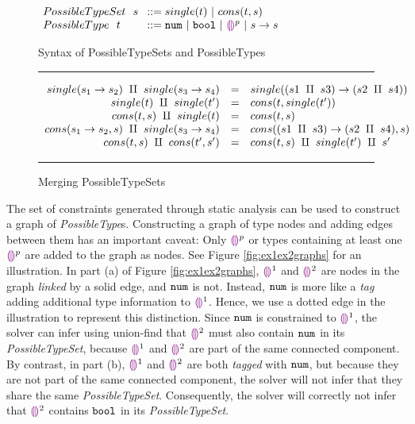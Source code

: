 \begin{figure}[h!]
\centering
\vspace{-3px} 
$\arraycolsep=4pt\begin{array}{lll}
PossibleTypeSet~~ s & ::= 
single(t) ~\vert~ 
cons(t, s)
\\
PossibleType~~ t & ::= 
  \tnum ~\vert~
  \tbool ~\vert~
  \ehole^p ~\vert~
  \tarr{s}{s}
  \\
\end{array}$
\label{fig:syntax_possible_type_sets}
\caption{Syntax of PossibleTypeSets and PossibleTypes}
\vspace{5px} 
\hrule
\[\begin{array}{rcl}
    single(s_1 \rightarrow s_2) ~\amalg~ single(s_3 \rightarrow s_4) & = & single({(s1 ~\amalg~ s3) \rightarrow (s2 ~\amalg~ s4)}) \\
    single(t) ~\amalg~ single(t') & = & cons(t, single(t')) \\
    cons(t,s) ~\amalg~ single(t) & = & cons(t, s) \\
    cons(s_1 \rightarrow s_2, s) ~\amalg~ single(s_3 \rightarrow s_4) & = & cons((s1 ~\amalg~ s3) \rightarrow (s2 ~\amalg~ s4) , s) \\
    cons(t,s) ~\amalg~ cons(t',s') & = & cons(t,s) ~\amalg~ single(t') ~\amalg~ s' \\
\end{array}\] 
\caption{Merging PossibleTypeSets}
\vspace{5px} 
\hrule
\label{fig:possible_type_sets}
\vspace{-5px}
\end{figure}

The set of constraints generated through static analysis can be used to construct a graph of \textit{PossibleType}s. Constructing a graph of type nodes and adding edges between them has an important caveat: Only $\textcolor{violet}{\llparenthesis}\textcolor{violet}{\rrparenthesis}^{p}$ or types containing at least one $\textcolor{violet}{\llparenthesis}\textcolor{violet}{\rrparenthesis}^{p}$ are added to the graph as nodes. See Figure \ref{fig:ex1ex2graphs} for an illustration. In part (a) of Figure \ref{fig:ex1ex2graphs}, $\textcolor{violet}{\llparenthesis}\textcolor{violet}{\rrparenthesis}^{1}$ and $\textcolor{violet}{\llparenthesis}\textcolor{violet}{\rrparenthesis}^{2}$ are nodes in the graph \textit{linked} by a solid edge, and $\mathtt{num}$ is not. Instead, $\mathtt{num}$ is more like a \textit{tag} adding additional type information to $\textcolor{violet}{\llparenthesis}\textcolor{violet}{\rrparenthesis}^{1}$. Hence, we use a dotted edge in the illustration to represent this distinction. Since $\mathtt{num}$ is constrained to $\textcolor{violet}{\llparenthesis}\textcolor{violet}{\rrparenthesis}^{1}$, the solver can infer using union-find that $\textcolor{violet}{\llparenthesis}\textcolor{violet}{\rrparenthesis}^{2}$ must also contain $\mathtt{num}$ in its \textit{PossibleTypeSet}, because $\textcolor{violet}{\llparenthesis}\textcolor{violet}{\rrparenthesis}^{1}$ and $\textcolor{violet}{\llparenthesis}\textcolor{violet}{\rrparenthesis}^{2}$ are part of the same connected component. By contrast, in part (b), $\textcolor{violet}{\llparenthesis}\textcolor{violet}{\rrparenthesis}^{1}$ and $\textcolor{violet}{\llparenthesis}\textcolor{violet}{\rrparenthesis}^{2}$ are both \textit{tagged} with $\mathtt{num}$, but because they are not part of the same connected component, the solver will not infer that they share the same \textit{PossibleTypeSet}. Consequently, the solver will correctly not infer that $\textcolor{violet}{\llparenthesis}\textcolor{violet}{\rrparenthesis}^2$ contains $\mathtt{bool}$ in its \textit{PossibleTypeSet}.

